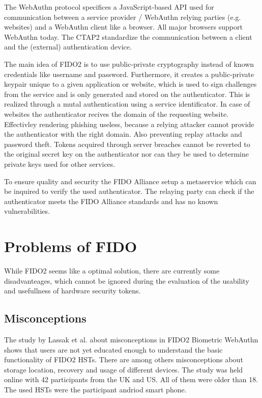 \documentclass[runningheads]{llncs}
\begin{document}
The WebAuthn protocol specifices a JavaScript-based API used for
communication between a service provider / WebAuthn relying parties (e.g. websites) and a WebAuthn client like a browser. All major browsers support WebAuthn today.\cite{000001}
The CTAP2 standardize the communication between a client and the (external) authentication device.\cite{274547}\cite{9099190}

The main idea of FIDO2 is to use public-private cryptography instead of known credentials like username and password. Furthermore, it creates a public-private keypair unique to a given application or website, which is used to sign challenges from the service and is only generated and stored on the authenticator. This is realized through a mutal authentication using a service identificator. In case of websites the authenticator recives the domain of the requesting website. Effectivley rendering phishing useless, because a relying attacker cannot provide the authenticator with the right domain.\cite{274610} Also preventing replay attacks and password theft. Tokens acquired through server breaches cannot be reverted to the original secret key on the authenticator nor can they be used to determine private keys used for other services.

To ensure quality and security the FIDO Alliance setup a metaservice which can be inquired to verify the used authenticator. The relaying party can check if the authenticator meets the FIDO Alliance standards and has no known vulnerabilities.\cite{9099190}

\section{Problems of FIDO}
While FIDO2 seems like a optimal solution, there are currently some disadvanteages, which cannot be ignored during the evaluation of the usability and usefullness of hardware security tokens.

\subsection{Misconceptions}
The study by Lassak et al.\cite{274547} about misconceptions in FIDO2 Biometric WebAuthn shows that users are not yet educated enough to understand the basic functionality of FIDO2 HSTs. There are among others misconceptions about storage location, recovery and usage of different devices. The study was held online with 42 participants from the UK and US. All of them were older than 18. The used HSTs were the participant andriod smart phone.
\end{document}
